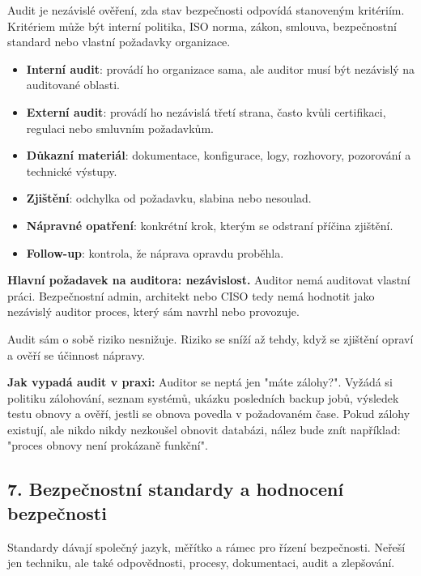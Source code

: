 \documentclass[11pt,a4paper]{article}
\newcommand{\itpr}[1]{\medskip\noindent\colorbox{green!8}{\parbox{\dimexpr\linewidth-2\fboxsep}{#1}}\medskip}
\newcommand{\itbox}[1]{\medskip\noindent\colorbox{black!6}{\parbox{\dimexpr\linewidth-2\fboxsep}{#1}}\medskip}
\begin{document}
Audit je nezávislé ověření, zda stav bezpečnosti odpovídá stanoveným kritériím. Kritériem může být interní politika, ISO norma, zákon, smlouva, bezpečnostní standard nebo vlastní požadavky organizace.

\begin{itemize}
    \item \textbf{Interní audit}: provádí ho organizace sama, ale auditor musí být nezávislý na auditované oblasti.
    \item \textbf{Externí audit}: provádí ho nezávislá třetí strana, často kvůli certifikaci, regulaci nebo smluvním požadavkům.
    \item \textbf{Důkazní materiál}: dokumentace, konfigurace, logy, rozhovory, pozorování a technické výstupy.
    \item \textbf{Zjištění}: odchylka od požadavku, slabina nebo nesoulad.
    \item \textbf{Nápravné opatření}: konkrétní krok, kterým se odstraní příčina zjištění.
    \item \textbf{Follow-up}: kontrola, že náprava opravdu proběhla.
\end{itemize}

\itbox{\textbf{Hlavní požadavek na auditora: nezávislost.} Auditor nemá auditovat vlastní práci. Bezpečnostní admin, architekt nebo CISO tedy nemá hodnotit jako nezávislý auditor proces, který sám navrhl nebo provozuje.}

Audit sám o sobě riziko nesnižuje. Riziko se sníží až tehdy, když se zjištění opraví a ověří se účinnost nápravy.

\itpr{\textbf{Jak vypadá audit v praxi:} Auditor se neptá jen "máte zálohy?". Vyžádá si politiku zálohování, seznam systémů, ukázku posledních backup jobů, výsledek testu obnovy a ověří, jestli se obnova povedla v požadovaném čase. Pokud zálohy existují, ale nikdo nikdy nezkoušel obnovit databázi, nález bude znít například: "proces obnovy není prokázaně funkční".}

\subsection*{7. Bezpečnostní standardy a hodnocení bezpečnosti}

Standardy dávají společný jazyk, měřítko a rámec pro řízení bezpečnosti. Neřeší jen techniku, ale také odpovědnosti, procesy, dokumentaci, audit a zlepšování.
\end{document}
